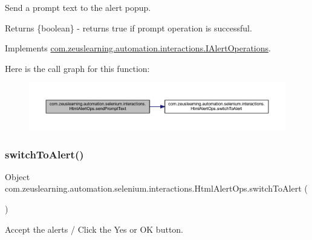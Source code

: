 Send a prompt text to the alert popup.

\begin{DoxyReturn}{Returns}
\{boolean\} -\/ returns {\ttfamily true} if prompt operation is successful. 
\end{DoxyReturn}


Implements \hyperlink{interfacecom_1_1zeuslearning_1_1automation_1_1interactions_1_1IAlertOperations_a1a33aeab4f1ae33df2a7abb46fd0edd3}{com.\+zeuslearning.\+automation.\+interactions.\+I\+Alert\+Operations}.

Here is the call graph for this function\+:\nopagebreak
\begin{figure}[H]
\begin{center}
\leavevmode
\includegraphics[width=350pt]{d9/d71/classcom_1_1zeuslearning_1_1automation_1_1selenium_1_1interactions_1_1HtmlAlertOps_a22d69cc0ac8d155f99a5dc1e48db142d_cgraph}
\end{center}
\end{figure}
\hypertarget{classcom_1_1zeuslearning_1_1automation_1_1selenium_1_1interactions_1_1HtmlAlertOps_a60bf8794a0914518cf2c670b478fb6c6}{}\label{classcom_1_1zeuslearning_1_1automation_1_1selenium_1_1interactions_1_1HtmlAlertOps_a60bf8794a0914518cf2c670b478fb6c6} 
\subsubsection{\texorpdfstring{switch\+To\+Alert()}{switchToAlert()}}
{\footnotesize\ttfamily Object com.\+zeuslearning.\+automation.\+selenium.\+interactions.\+Html\+Alert\+Ops.\+switch\+To\+Alert (\begin{DoxyParamCaption}{ }\end{DoxyParamCaption})\hspace{0.3cm}{\ttfamily [inline]}}

Accept the alerts / Click the {\ttfamily Yes} or {\ttfamily OK} button.

